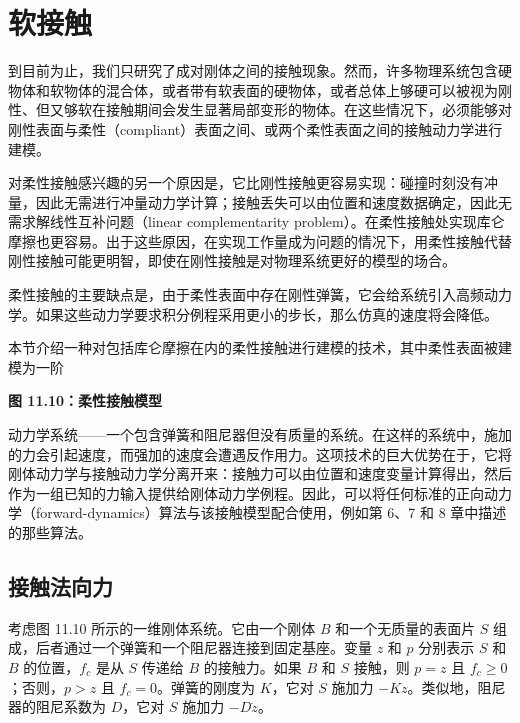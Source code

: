 \documentclass[10pt,a4paper]{book}
\theoremstyle{thmstyle} %
\theoremstyle{defstyle} %
\theoremstyle{prostyle} %
\begin{document}
\section{软接触}





到目前为止，我们只研究了成对刚体之间的接触现象。然而，许多物理系统包含硬物体和软物体的混合体，或者带有软表面的硬物体，或者总体上够硬可以被视为刚性、但又够软在接触期间会发生显著局部变形的物体。在这些情况下，必须能够对刚性表面与柔性（compliant）表面之间、或两个柔性表面之间的接触动力学进行建模。



对柔性接触感兴趣的另一个原因是，它比刚性接触更容易实现：碰撞时刻没有冲量，因此无需进行冲量动力学计算；接触丢失可以由位置和速度数据确定，因此无需求解线性互补问题（linear complementarity problem）。在柔性接触处实现库仑摩擦也更容易。出于这些原因，在实现工作量成为问题的情况下，用柔性接触代替刚性接触可能更明智，即使在刚性接触是对物理系统更好的模型的场合。



柔性接触的主要缺点是，由于柔性表面中存在刚性弹簧，它会给系统引入高频动力学。如果这些动力学要求积分例程采用更小的步长，那么仿真的速度将会降低。



本节介绍一种对包括库仑摩擦在内的柔性接触进行建模的技术，其中柔性表面被建模为一阶



\noindent\textbf{图 11.10：柔性接触模型}





动力学系统——一个包含弹簧和阻尼器但没有质量的系统。在这样的系统中，施加的力会引起速度，而强加的速度会遭遇反作用力。这项技术的巨大优势在于，它将刚体动力学与接触动力学分离开来：接触力可以由位置和速度变量计算得出，然后作为一组已知的力输入提供给刚体动力学例程。因此，可以将任何标准的正向动力学（forward-dynamics）算法与该接触模型配合使用，例如第 6、7 和 8 章中描述的那些算法。



\subsection{接触法向力}





考虑图 11.10 所示的一维刚体系统。它由一个刚体 $B$ 和一个无质量的表面片 $S$ 组成，后者通过一个弹簧和一个阻尼器连接到固定基座。变量 $z$ 和 $p$ 分别表示 $S$ 和 $B$ 的位置，$f_c$ 是从 $S$ 传递给 $B$ 的接触力。如果 $B$ 和 $S$ 接触，则 $p = z$ 且 $f_c \geq 0$；否则，$p > z$ 且 $f_c = 0$。弹簧的刚度为 $K$，它对 $S$ 施加力 $-Kz$。类似地，阻尼器的阻尼系数为 $D$，它对 $S$ 施加力 $-D\dot{z}$。
\end{document}
